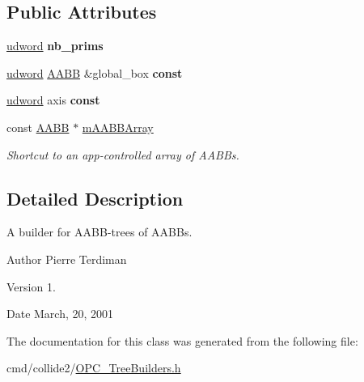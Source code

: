 \subsection*{Public Attributes}
\begin{DoxyCompactItemize}
\item 
\hyperlink{IceTypes_8h_a44c6f1920ba5551225fb534f9d1a1733}{udword} {\bfseries nb\+\_\+prims}\hypertarget{classAABBTreeOfAABBsBuilder_a67b547425865dfd0666bcb25b9db8978}{}\label{classAABBTreeOfAABBsBuilder_a67b547425865dfd0666bcb25b9db8978}

\item 
\hyperlink{IceTypes_8h_a44c6f1920ba5551225fb534f9d1a1733}{udword} \hyperlink{classAABB}{A\+A\+BB} \&global\+\_\+box {\bfseries const}\hypertarget{classAABBTreeOfAABBsBuilder_aab7fd0453729c3c2bccbde62cc45ee5f}{}\label{classAABBTreeOfAABBsBuilder_aab7fd0453729c3c2bccbde62cc45ee5f}

\item 
\hyperlink{IceTypes_8h_a44c6f1920ba5551225fb534f9d1a1733}{udword} axis {\bfseries const}\hypertarget{classAABBTreeOfAABBsBuilder_af4e33d234e9361e05c9c573fe75cd556}{}\label{classAABBTreeOfAABBsBuilder_af4e33d234e9361e05c9c573fe75cd556}

\item 
const \hyperlink{classAABB}{A\+A\+BB} $\ast$ \hyperlink{classAABBTreeOfAABBsBuilder_af9744ff347031aa034de95b421a44c5a}{m\+A\+A\+B\+B\+Array}\hypertarget{classAABBTreeOfAABBsBuilder_af9744ff347031aa034de95b421a44c5a}{}\label{classAABBTreeOfAABBsBuilder_af9744ff347031aa034de95b421a44c5a}

\begin{DoxyCompactList}\small\item\em Shortcut to an app-\/controlled array of A\+A\+B\+Bs. \end{DoxyCompactList}\end{DoxyCompactItemize}


\subsection{Detailed Description}
A builder for A\+A\+B\+B-\/trees of A\+A\+B\+Bs.

\begin{DoxyAuthor}{Author}
Pierre Terdiman 
\end{DoxyAuthor}
\begin{DoxyVersion}{Version}
1. 
\end{DoxyVersion}
\begin{DoxyDate}{Date}
March, 20, 2001 
\end{DoxyDate}


The documentation for this class was generated from the following file\+:\begin{DoxyCompactItemize}
\item 
cmd/collide2/\hyperlink{OPC__TreeBuilders_8h}{O\+P\+C\+\_\+\+Tree\+Builders.\+h}\end{DoxyCompactItemize}
